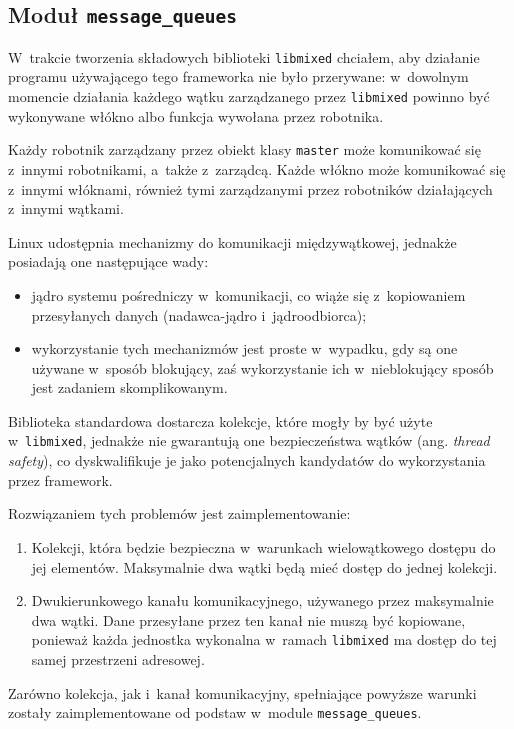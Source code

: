 \documentclass[12pt]{mwart}
\newcommand{\code}{\texttt}
\begin{document}
\subsection{Moduł \code{message\_queues}}
\label{sec:messagequeues}
%
\indent
  W~trakcie tworzenia składowych biblioteki \code{libmixed} chciałem, aby działanie programu używającego tego frameworka nie było przerywane:
  w~dowolnym momencie działania każdego wątku zarządzanego przez \code{libmixed} powinno być wykonywane włókno albo funkcja wywołana przez robotnika. 
\par
\indent
  Każdy robotnik zarządzany przez obiekt klasy \code{master} może komunikować się z~innymi robotnikami, a~także z~zarządcą. Każde włókno może komunikować
  się z~innymi włóknami, również tymi zarządzanymi przez robotników działających z~innymi wątkami.
\par
\indent
  Linux udostępnia mechanizmy do komunikacji międzywątkowej, jednakże posiadają one następujące wady:
  \begin{itemize}
    \item jądro systemu pośredniczy w~komunikacji, co wiąże się z~kopiowaniem przesyłanych danych (nadawca-jądro i~jądro\dywiz odbiorca);
    \item wykorzystanie tych mechanizmów jest proste w~wypadku, gdy są one używane w~sposób blokujący, zaś wykorzystanie ich w~nieblokujący
      sposób jest zadaniem skomplikowanym.
  \end{itemize}
  Biblioteka standardowa dostarcza kolekcje, które mogły by być użyte w~\code{libmixed}, jednakże nie gwarantują one bezpieczeństwa wątków
  (ang. \emph{thread safety}), co dyskwalifikuje je jako potencjalnych kandydatów do wykorzystania przez framework.
\par
\indent
  Rozwiązaniem tych problemów jest zaimplementowanie:
  \begin{enumerate}
    \item Kolekcji, która będzie bezpieczna w~warunkach wielowątkowego dostępu do jej elementów. Maksymalnie dwa wątki będą mieć dostęp
      do jednej kolekcji.
    \item Dwukierunkowego kanału komunikacyjnego, używanego przez maksymalnie dwa wątki. Dane przesyłane przez ten kanał nie muszą być kopiowane,
      ponieważ każda jednostka wykonalna w~ramach \code{libmixed} ma dostęp do tej samej przestrzeni adresowej.
  \end{enumerate}
  Zarówno kolekcja, jak i~kanał komunikacyjny, spełniające powyższe warunki zostały zaimplementowane od podstaw w~module \code{message\_queues}.
\end{document}
